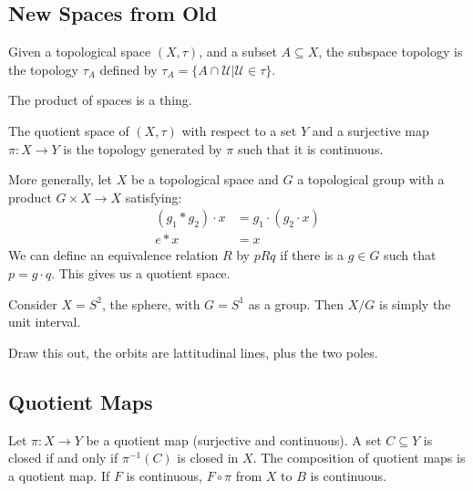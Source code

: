 \documentclass{article}                                                        %
\begin{document}
        \subsection{New Spaces from Old}
            \begin{definition}
                Given a topological space $(X,\tau)$, and a subset
                $A\subseteq{X}$, the subspace topology is the topology
                $\tau_{A}$ defined by
                $\tau_{A}=\{A\cap\mathcal{U}|\mathcal{U}\in\tau\}$.
            \end{definition}
            \begin{definition}
                The product of spaces is a thing.
            \end{definition}
            \begin{definition}
                The quotient space of $(X,\tau)$ with respect to a set $Y$ and
                a surjective map $\pi:X\rightarrow{Y}$ is the topology generated
                by $\pi$ such that it is continuous.
            \end{definition}
            More generally, let $X$ be a topological space and $G$ a topological
            group with a product $G\times{X}\rightarrow{X}$ satisfying:
            \begin{align}
                (g_{1}*{g}_{2})\cdot{x}&=g_{1}\cdot(g_{2}\cdot{x})\\
                e*x&=x
            \end{align}
            We can define an equivalence relation $R$ by $pRq$ if there is a
            $g\in{G}$ such that $p=g\cdot{q}$. This gives us a quotient space.
            \begin{example}
                Consider $X=S^{2}$, the sphere, with $G=S^{1}$ as a group.
                Then $X/G$ is simply the unit interval.
            \end{example}
            Draw this out, the orbits are lattitudinal lines, plus the two
            poles.
        \subsection{Quotient Maps}
            Let $\pi:X\rightarrow{Y}$ be a quotient map (surjective and
            continuous). A set $C\subseteq{Y}$ is closed if and only if
            $\pi^{\minus{1}}(C)$ is closed in $X$. The composition of quotient
            maps is a quotient map. If $F$ is continuous, $F\circ\pi$ from $X$
            to $B$ is continuous.
\end{document}
